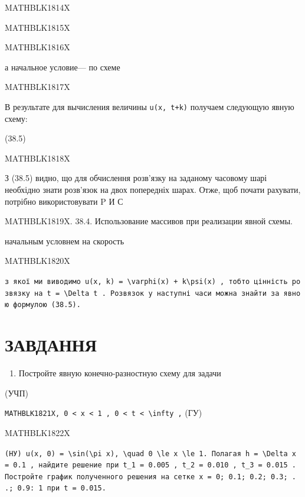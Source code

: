 \documentclass[
  ukrainian,
]{article}
\providecommand{\tightlist}{%
  \setlength{\itemsep}{0pt}\setlength{\parskip}{0pt}}
\begin{document}
MATHBLK1814X

MATHBLK1815X

MATHBLK1816X

а начальное условие--- по схеме

MATHBLK1817X

В результате для вычисления величины \texttt{u(x,\ t+k)} получаем
следующую явную схему:

(38.5)

MATHBLK1818X

З (38.5) видно, що для обчислення розв'язку на заданому часовому шарі
необхідно знати розв'язок на двох попередніх шарах. Отже, щоб почати
рахувати, потрібно використовувати P И С

MATHBLK1819X. 38.4. Использование массивов при реализации явной схемы.

начальным условнем на скорость

MATHBLK1820X

\texttt{з\ якої\ ми\ виводимо\ \textquotesingle{}u(x,\ k)\ =\ \textbackslash{}varphi(x)\ +\ k\textbackslash{}psi(x)\textquotesingle{}\ ,\ тобто\ цінність\ розв\textquotesingle{}язку\ на\ \textquotesingle{}t\ =\ \textbackslash{}Delta\ t\textquotesingle{}\ .\ Розв\textquotesingle{}язок\ у\ наступні\ часи\ можна\ знайти\ за\ явною\ формулою\ (38.5).}

\section{ЗАВДАННЯ}\label{ux437ux430ux432ux434ux430ux43dux43dux44f-2}

\begin{enumerate}
\def\labelenumi{\arabic{enumi}.}
\tightlist
\item
  Постройте явную конечно-разностную схему для задачи
\end{enumerate}

(УЧП)

\texttt{MATHBLK1821X,\ \textquotesingle{}0\ \textless{}\ x\ \textless{}\ 1\textquotesingle{}\ ,\ \textquotesingle{}0\ \textless{}\ t\ \textless{}\ \textbackslash{}infty\textquotesingle{}\ ,}
(ГУ)

MATHBLK1822X

\texttt{(HУ)\ \textquotesingle{}u(x,\ 0)\ =\ \textbackslash{}sin(\textbackslash{}pi\ x),\ \textbackslash{}quad\ 0\ \textbackslash{}le\ x\ \textbackslash{}le\ 1.\textquotesingle{}\ Полагая\ \textquotesingle{}h\ =\ \textbackslash{}Delta\ x\ =\ 0.1\textquotesingle{}\ ,\ найдите\ решение\ при\ \textquotesingle{}t\_1\ =\ 0.005\textquotesingle{}\ ,\ \textquotesingle{}t\_2\ =\ 0.010\textquotesingle{}\ ,\ \textquotesingle{}t\_3\ =\ 0.015\textquotesingle{}\ .\ Постройте\ график\ полученного\ решения\ на\ сетке\ x\ =\ 0;\ 0.1;\ 0.2;\ 0.3;\ .\ .;\ 0.9:\ 1\ при\ t\ =\ 0.015.}
\end{document}
